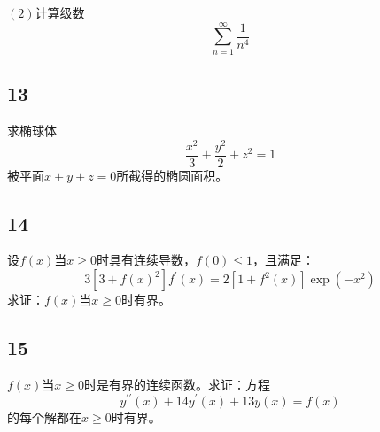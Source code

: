 \documentclass[a4paper,12pt]{article}
\begin{document}
\noindent$\left(2\right)$计算级数
\begin{equation*}
	\sum_{n=1}^{\infty}\frac{1}{n^4}
\end{equation*}
\subsection*{13}
\noindent 求椭球体
\begin{equation*}
	\frac{x^2}{3}+\frac{y^2}{2}+z^2=1
\end{equation*}
被平面$x+y+z=0$所截得的椭圆面积。
\subsection*{14}\noindent 设$f(x)$当$x\geq 0$时具有连续导数，$f(0)\leq 1$，且满足：\begin{equation*}
	3\left[3+f(x)^2\right]f^{\prime}(x)=2\left[1+f^{2}(x)\right]\exp(-x^2)
\end{equation*}
求证：$f(x)$当$x\geq 0$时有界。
\subsection*{15}\noindent $f(x)$当$x\geq 0$时是有界的连续函数。求证：方程
\begin{equation*}
	y^{\prime\prime}(x)+14y^{\prime}(x)+13y(x)=f(x)
\end{equation*}
的每个解都在$x\geq 0$时有界。
\end{document}
